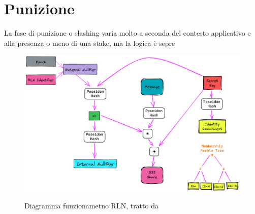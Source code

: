 \section{Punizione}
La fase di punizione o slashing varia molto a seconda del contesto applicativo e alla presenza o meno di una stake,
ma la logica è sepre 

\begin{figure}[H]
    \centering
    \includegraphics[width=12cm]{./chapters/2.rln-protocol/images/5.rln_flow.png}
    \label{fig:rln_flow}
    \captionsetup{justification=centering}
    \caption{Diagramma funzionametno RLN, tratto da \cite{rln_doc}}
\end{figure}


